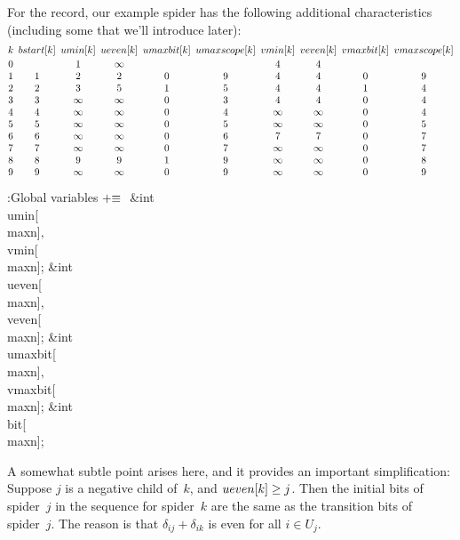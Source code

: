 For the record, our example spider has the following additional
characteristics (including some that we'll introduce later):
$$\vbox{\halign{$\hfil#\hfil$\enspace&
$\hfil#\hfil$\enspace&
$\hfil#\hfil$\enspace&
$\hfil#\hfil$\enspace&
$\hfil#\hfil$\enspace&
$\hfil#\hfil$\enspace&
$\hfil#\hfil$\enspace&
$\hfil#\hfil$\enspace&
$\hfil#\hfil$\enspace&
$\hfil#\hfil$\cr
k&\PB{\\{bstart}}[k]&\PB{\\{umin}}[k]&\PB{\\{ueven}}[k]&\PB{\\{umaxbit}}[k]&%
\PB{\\{umaxscope}}[k]&
\PB{\\{vmin}}[k]&\PB{\\{veven}}[k]&\PB{\\{vmaxbit}}[k]&\PB{\\{vmaxscope}}[k]\cr
\noalign{\vskip2pt}
0& &1&\infty& & &4&4\cr
1&1&2&2&0&9&4&4&0&9\cr
2&2&3&5&1&5&4&4&1&4\cr
3&3&\infty&\infty&0&3&4&4&0&4\cr
4&4&\infty&\infty&0&4&\infty&\infty&0&4\cr
5&5&\infty&\infty&0&5&\infty&\infty&0&5\cr
6&6&\infty&\infty&0&6&7&7&0&7\cr
7&7&\infty&\infty&0&7&\infty&\infty&0&7\cr
8&8&9&9&1&9&\infty&\infty&0&8\cr
9&9&\infty&\infty&0&9&\infty&\infty&0&9\cr
}}$$

\Y\B\4:Global variables\X${}\mathrel+\equiv{}$\6
\&{int} \\{umin}[\\{maxn}]${},{}$ \\{vmin}[\\{maxn}];\6
\&{int} \\{ueven}[\\{maxn}]${},{}$ \\{veven}[\\{maxn}];\6
\&{int} \\{umaxbit}[\\{maxn}]${},{}$ \\{vmaxbit}[\\{maxn}];\6
\&{int} \\{bit}[\\{maxn}];\par
\fi

A somewhat subtle point arises here, and it provides an important
simplification: Suppose $j$ is a negative child of~$k$,
and $\relax{\\{ueven}}[k]\ge j$. Then the initial bits of spider~$j$ in the
sequence
for spider~$k$ are the same as the transition bits of spider~$j$.
The reason is that $\delta_{ij}+\delta_{ik}$ is even for all
$i\in U_j$.

